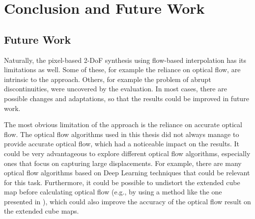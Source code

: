 \chapter{Conclusion and Future Work}

\section{Future Work} \label{sec:future_work}
Naturally, the pixel-based 2-DoF synthesis using flow-based interpolation has its limitations as well.
Some of these, for example the reliance on optical flow, are intrinsic to the approach. Others, for example the problem of abrupt discontinuities, were uncovered by the evaluation. In most cases, there are possible changes and adaptations, so that the results could be improved in future work.

The most obvious limitation of the approach is the reliance on accurate optical flow. The optical flow algorithms used in this thesis did not always manage to provide accurate optical flow, which had a noticeable impact on the results. It could be very advantageous to explore different optical flow algorithms, especially ones that focus on capturing large displacements. For example, there are many optical flow algorithms based on Deep Learning techniques \cite{of-deep} that could be relevant for this task. Furthermore, it could be possible to undistort the extended cube map before calculating optical flow (e.g., by using a method like the one presented in \cite{fov}), which could also improve the accuracy of the optical flow result on the extended cube maps.


